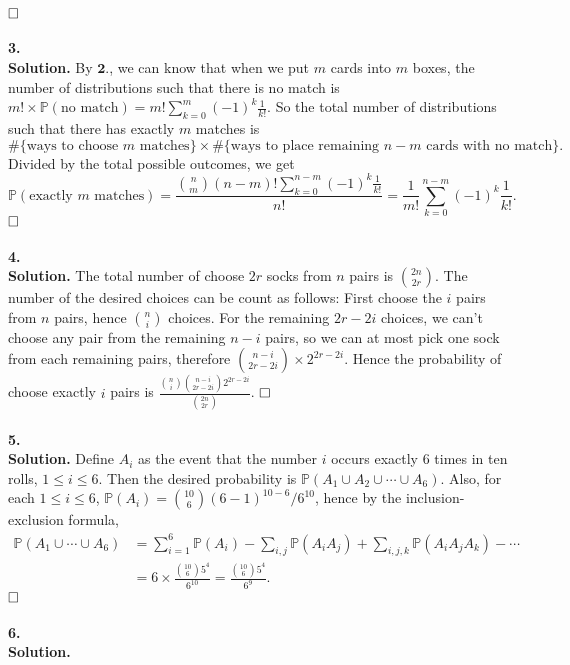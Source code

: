 \documentclass[12pt]{article}
\begin{document}
$\hspace{\fill}\square$
\\ \\
\textbf{3.}\\
\textbf{Solution.} By $\textbf{2.}$, we can know that when we put $m$ cards into $m$ boxes, the number of distributions such that there is no match is $m!\times\mathbb{P}(\text{no match})=m!\sum_{k=0}^m(-1)^k\frac{1}{k!}$. So the total number of distributions such that there has exactly $m$ matches is
\begin{equation*}
\#\{\text{ways to choose $m$ matches}\}\times \#\{\text{ways to place remaining $n-m$ cards with no match}\}.
\end{equation*}
Divided by the total possible outcomes, we get
\begin{equation*}
\mathbb{P}(\text{exactly $m$ matches})=\frac{\binom{n}{m}(n-m)!\sum_{k=0}^{n-m}(-1)^k\frac{1}{k!}}{n!}=\frac{1}{m!}\sum_{k=0}^{n-m}(-1)^k\frac{1}{k!}.
\end{equation*}
$\hspace{\fill}\square$
\\ \\
\textbf{4.}\\
\textbf{Solution.} The total number of choose $2r$ socks from $n$ pairs is $\binom{2n}{2r}$. The number of the desired choices can be count as follows: First choose the $i$ pairs from $n$ pairs, hence $\binom{n}{i}$ choices. For the remaining $2r-2i$ choices, we can't choose any pair from the remaining $n-i$ pairs, so we can at most pick one sock from each remaining pairs, therefore $\binom{n-i}{2r-2i}\times 2^{2r-2i}$. Hence the probability of choose exactly $i$ pairs is $\frac{\binom{n}{i}\binom{n-i}{2r-2i} 2^{2r-2i}}{\binom{2n}{2r}}$.
$\hspace{\fill}\square$
\\ \\
\textbf{5.}\\
\textbf{Solution.} Define $A_i$ as the event that the number $i$ occurs exactly $6$ times in ten rolls, $1\leq i\leq 6$. Then the desired probability is $\mathbb{P}(A_1\cup A_2\cup\cdots\cup A_6)$. Also, for each $1\leq i\leq 6$, $\mathbb{P}(A_i)=\binom{10}{6}(6-1)^{10-6}/6^{10}$, hence by the inclusion-exclusion formula,
\begin{equation*}
\begin{aligned}
\mathbb{P}(A_1\cup\cdots\cup A_6)&=\sum_{i=1}^6\mathbb{P}(A_i)-\sum_{i,j}\mathbb{P}(A_iA_j)+\sum_{i,j,k}\mathbb{P}(A_iA_jA_k)-\cdots \\&
=6\times\frac{\binom{10}{6}5^4}{6^{10}}=\frac{\binom{10}{6}5^4}{6^{9}}.
\end{aligned}
\end{equation*}
$\hspace{\fill}\square$
\\ \\
\textbf{6.}\\
\textbf{Solution.} 
\end{document}
